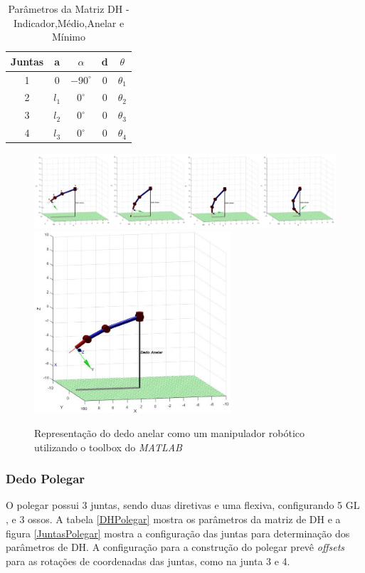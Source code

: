 \begin{table}[H]
\centering
\caption{Parâmetros da Matriz DH - Indicador,Médio,Anelar e Mínimo}
\label{DHResto}
\begin{tabular}{|c|c|c|c|c|}
	\hline
    Juntas & a & $\alpha$ & d & $\theta$ \\ \hline
    1 & 0 & $-90^\circ$ & 0 & $\theta_1$ \\ \hline
    2 & $l_1$ & $0^\circ$ & 0 & $\theta_2$ \\ \hline
    3 & $l_2$ & $0^\circ$ & 0 & $\theta_3$ \\ \hline
    4 & $l_3$ & $0^\circ$ & 0 & $\theta_4$ \\
	\hline
\end{tabular}
\end{table}

\begin{figure}[H]
\centering
\includegraphics[width = 1\textwidth]{img/Anelar.JPG}
\includegraphics[width = 0.65\textwidth]{img/Anelar1.JPG}
\caption[Representação do dedo anelar como um manipulador robótico]{Representação do dedo anelar como um manipulador robótico utilizando o toolbox do \textit{MATLAB} \cite{corke1996robotics}}
\label{JuntasResto}
\end{figure}



\subsubsection{Dedo Polegar}
O polegar possui 3 juntas, sendo duas diretivas e uma flexiva, configurando 5 GL \cite{lee1995model}, e 3 ossos. A tabela \ref{DHPolegar} mostra os parâmetros da matriz de DH e a figura \ref{JuntasPolegar} mostra a configuração das juntas para determinação dos parâmetros de DH. A configuração para a construção do polegar prevê \textit{offsets} para as rotações de coordenadas das juntas, como na junta 3 e 4.

